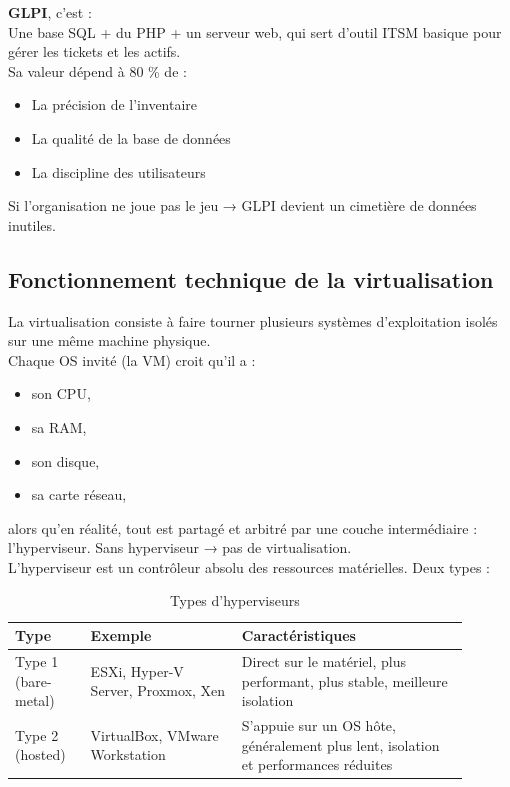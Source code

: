 \newpage

\noindent \textbf{GLPI}, c’est : \\
Une base SQL + du PHP + un serveur web, qui sert d’outil ITSM basique pour gérer les tickets et les actifs. \\
Sa valeur dépend à 80 \% de :
\begin{itemize}
  \item La précision de l’inventaire
  \item La qualité de la base de données
  \item La discipline des utilisateurs
\end{itemize}

\noindent Si l’organisation ne joue pas le jeu → GLPI devient un cimetière de données inutiles.

\subsection*{Fonctionnement technique de la virtualisation}
{}
\noindent La virtualisation consiste à faire tourner plusieurs systèmes d’exploitation isolés sur une même machine physique. \\

\noindent Chaque OS invité (la VM) croit qu’il a :
\begin{itemize}
  \item son CPU,
  \item sa RAM,
  \item son disque,
  \item sa carte réseau,
\end{itemize}

\noindent alors qu'en réalité, tout est partagé et arbitré par une couche intermédiaire : l'hyperviseur.
Sans hyperviseur → pas de virtualisation. \\ 

\noindent L’hyperviseur est un contrôleur absolu des ressources matérielles.
Deux types : 
\begin{table}[h]
  \centering
    \begin{tabular}{|p{0.15\linewidth}|p{0.30\linewidth}|p{0.45\linewidth}|}
    \hline
    \textbf{Type} & \textbf{Exemple} & \textbf{Caractéristiques} \\ \hline
    Type 1 (bare-metal) & ESXi, Hyper-V Server, Proxmox, Xen & Direct sur le matériel, plus performant, plus stable, meilleure isolation \\ \hline
    Type 2 (hosted) & VirtualBox, VMware Workstation & S’appuie sur un OS hôte, généralement plus lent, isolation et performances réduites \\ \hline
    \end{tabular}
  \caption{Types d'hyperviseurs}
\end{table}

